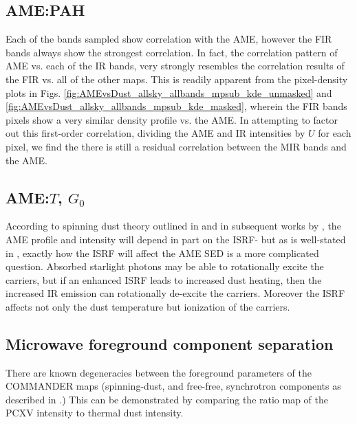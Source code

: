           \subsection{AME:PAH}
            Each of the bands sampled show correlation with the AME, however the FIR bands always show the strongest correlation. In fact, the correlation pattern of AME vs. each of the IR bands, very strongly resembles the correlation results of the FIR vs. all of the other maps. This is readily apparent from the pixel-density plots in Figs. \ref{fig:AMEvsDust_allsky_allbands_mpsub_kde_unmasked} and \ref{fig:AMEvsDust_allsky_allbands_mpsub_kde_masked}, wherein the FIR bands pixels show a very similar density profile vs. the AME. In attempting to factor out this first-order correlation, dividing the AME and IR intensities by $U$ for each pixel, we find the there is still a residual correlation between the MIR bands and the AME.

          \subsection{AME:$T$, $G_{0}$}
            According to spinning dust theory outlined in \cite{draine98a} and in subsequent works by \cite{ysard10a}, the AME profile and intensity will depend in part on the ISRF- but as is well-stated in \cite{hensley17a}, exactly how the ISRF will affect the AME SED is a more complicated question. Absorbed starlight photons may be able to rotationally excite the carriers, but if an enhanced ISRF leads to increased dust heating, then the increased IR emission can rotationally de-excite the carriers. Moreover the ISRF affects not only the dust temperature but ionization of the carriers.


          \subsection{Microwave foreground component separation}

            There are known degeneracies between the foreground parameters of the COMMANDER maps (spinning-dust, and free-free, synchrotron components as described in \cite{planck15X}.) This can be demonstrated by comparing the ratio map of the PCXV intensity to thermal dust intensity.
